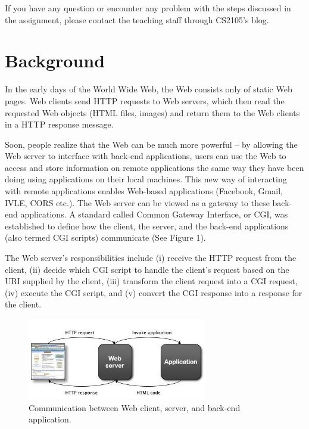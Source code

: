 \documentclass[a4paper,11pt]{exam}
\begin{document}
If you have any question or encounter any problem with the steps discussed in the assignment, please contact the teaching staff through CS2105's blog.

\section*{Background}

In the early days of the World Wide Web, the Web consists only of static Web pages. Web clients send HTTP requests to Web servers, which then read the requested Web objects (HTML files, images) and return them to the Web clients in a HTTP response message.

Soon, people realize that the Web can be much more powerful -- by allowing the Web server to interface with back-end applications, users can use the Web to access and store information on remote applications the same way they have been doing using applications on their local machines. This new way of interacting with remote applications enables Web-based applications (Facebook, Gmail, IVLE, CORS etc.). The Web server can be viewed as a gateway to these back-end applications. A standard called Common Gateway Interface, or CGI, was established to define how the client, the server, and the back-end applications (also termed CGI scripts) communicate (See Figure 1).

The Web server's responsibilities include (i) receive the HTTP request from the client, (ii) decide which CGI script to handle the client's request based on the URI supplied by the client, (iii) transform the client request into a CGI request, (iv) execute the CGI script, and (v) convert the CGI response into a response for the client.

\begin{figure}
\begin{center}
	\includegraphics[width=0.7\textwidth]{cgi.jpg}
\end{center}
\caption{Communication between Web client, server, and back-end application.}
\end{figure}
\end{document}
